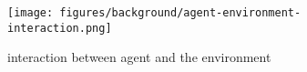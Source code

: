 \begin{figure}
	\centering
    \texttt{[image: figures/background/agent-environment-interaction.png]}
	\caption{interaction between agent and the environment}
	\label{fig:agent-environment_interaction}
	\endminipage
\end{figure}


